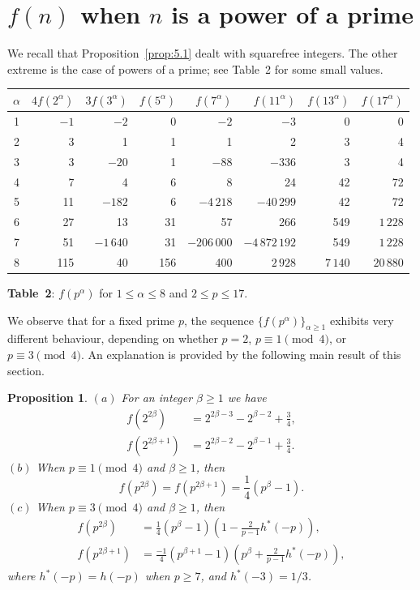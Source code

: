 \documentclass{amsart}
\theoremstyle{plain}
\newtheorem{proposition}[theorem]{Proposition}
\numberwithin{equation}{section}
\begin{document}
\section{$f(n)$ when $n$ is a power of a prime}\label{sec:6}

We recall that Proposition~\ref{prop:5.1} dealt with squarefree integers.
The other extreme is the case of powers of a prime; see Table~2 for some 
small values.

\bigskip
\begin{center}
\begin{tabular}{|c||r|r|r|r|r|r|r|}
\hline
$\alpha$ & $4f(2^\alpha)$ & $3f(3^\alpha)$ & $f(5^\alpha)$ & $f(7^\alpha)$ & 
$f(11^\alpha)$ & $f(13^\alpha)$ & $f(17^\alpha)$ \\
\hline
1 & $-1$ & $-2$ & 0 & $-2$ & $-3$ & 0 & 0 \\
2 &   3  &   1  & 1 &   1  &   2  & 3 & 4\\
3 &   3  & $-20$& 1 & $-88$& $-336$ & 3 & 4\\
4 &   7  &   4  & 6 &   8  &   24 & 42 & 72\\
5 &  11  & $-182$& 6& $-4\,218$ & $-40\,299$ & 42 & 72 \\
6 &  27  &  13  & 31 & 57  & 266  & 549 & $1\,228$\\
7 &  51  & $-1\,640$& 31 & $-206\,000$ & $-4\,872\,192$ & 549 & $1\,228$ \\
8 &  115 & 40 & 156 & 400 & $2\,928$ & $7\,140$ & $20\,880$\\
\hline
\end{tabular}

\medskip
{\bf Table~2}: $f(p^\alpha)$ for $1\leq\alpha\leq 8$ and $2\leq p\leq 17$.
\end{center}
\bigskip

We observe that for a fixed prime $p$, the sequence
$\{f(p^\alpha)\}_{\alpha\geq 1}$ exhibits very different behaviour, depending
on whether  $p=2$, $p\equiv 1\pmod{4}$, or $p\equiv 3\pmod{4}$. 
An explanation is provided by the following main result of this section.

\begin{proposition}\label{prop:6.1}
$(a)$ For an integer $\beta\geq 1$ we have
\begin{align}
f(2^{2\beta})&= 2^{2\beta-3}-2^{\beta-2}+\frac{3}{4},\label{6.1}\\
f(2^{2\beta+1})&= 2^{2\beta-2}-2^{\beta-1}+\frac{3}{4}.\label{6.2}
\end{align}
$(b)$ When $p\equiv 1\pmod{4}$ and $\beta\geq 1$, then
\begin{equation}\label{6.3}
f(p^{2\beta})=f(p^{2\beta+1}) = \frac{1}{4}\left(p^{\beta}-1\right).
\end{equation}
$(c)$ When $p\equiv 3\pmod{4}$ and $\beta\geq 1$, then
\begin{align}
f(p^{2\beta})&= \frac{1}{4}\left(p^{\beta}-1\right)
\left(1-\frac{2}{p-1}h^*(-p)\right),\label{6.4}\\
f(p^{2\beta+1})&= \frac{-1}{4}\left(p^{\beta+1}-1\right)
\left(p^{\beta}+\frac{2}{p-1}h^*(-p)\right),\label{6.5}
\end{align}
where $h^*(-p)=h(-p)$ when $p\geq 7$, and $h^*(-3)=1/3$.
\end{proposition}
\end{document}
